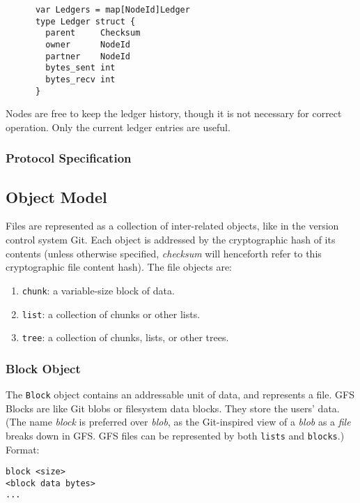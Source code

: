 \documentclass{sig-alternate}
\begin{document}
\begin{verbatim}
      var Ledgers = map[NodeId]Ledger
      type Ledger struct {
        parent     Checksum
        owner      NodeId
        partner    NodeId
        bytes_sent int
        bytes_recv int
      }
\end{verbatim}

Nodes are free to keep the ledger history, though it is not necessary for
correct operation. Only the current ledger entries are useful.

\subsubsection{Protocol Specification}



\subsection{Object Model}

Files are represented as a collection of inter-related objects, like in the
version control system Git. Each object is addressed by the cryptographic hash of its contents (unless otherwise specified, \textit{checksum} will henceforth refer to this cryptographic file content hash). The file objects are:

\begin{enumerate}
  \item \texttt{chunk}: a variable-size block of data.
  \item \texttt{list}: a collection of chunks or other lists.
  \item \texttt{tree}: a collection of chunks, lists, or other trees.
\end{enumerate}

\subsubsection{Block Object}

The \texttt{Block} object contains an addressable unit of data, and
represents a file.
GFS Blocks are like Git blobs or filesystem data blocks. They store the
users' data. (The name \textit{block} is preferred over \textit{blob}, as the
Git-inspired view of a \textit{blob} as a \textit{file} breaks down in GFS.
GFS files can be represented by both \texttt{lists} and \texttt{blocks}.)
Format:
\begin{verbatim}
block <size>
<block data bytes>
...
\end{verbatim}
\end{document}
